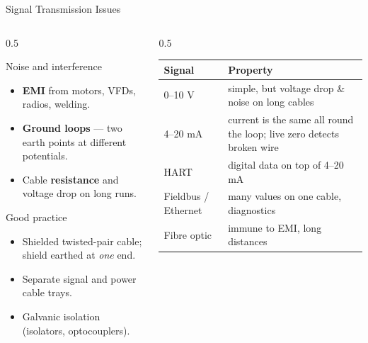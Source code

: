 \documentclass[aspectratio=169]{beamer}
\begin{document}
	\begin{frame}{Signal Transmission Issues}
		\begin{columns}[T]
			\begin{column}{0.5\textwidth}
				\begin{block}{Noise and interference}
					\begin{itemize}\small
						\item \textbf{EMI} from motors, VFDs, radios, welding.
						\item \textbf{Ground loops} --- two earth points at different potentials.
						\item Cable \textbf{resistance} and voltage drop on long runs.
					\end{itemize}
				\end{block}
				\begin{block}{Good practice}
					\begin{itemize}\small
						\item Shielded twisted-pair cable; shield earthed at \emph{one} end.
						\item Separate signal and power cable trays.
						\item Galvanic isolation (isolators, optocouplers).
					\end{itemize}
				\end{block}
			\end{column}
			\begin{column}{0.5\textwidth}
				\renewcommand{\arraystretch}{1.25}
				\centering
				\small
				\begin{tabular}{@{}>{\raggedright}p{2.2cm}>{\raggedright\arraybackslash}p{3.6cm}@{}}
					\toprule
					\textbf{Signal} & \textbf{Property} \\
					\midrule
					0--10 V      & simple, but voltage drop \& noise on long cables \\
					4--20 mA     & current is the same all round the loop; live zero detects broken wire \\
					HART         & digital data on top of 4--20 mA \\
					Fieldbus / Ethernet & many values on one cable, diagnostics \\
					Fibre optic  & immune to EMI, long distances \\
					\bottomrule
				\end{tabular}
			\end{column}
		\end{columns}
	\end{frame}
\end{document}
